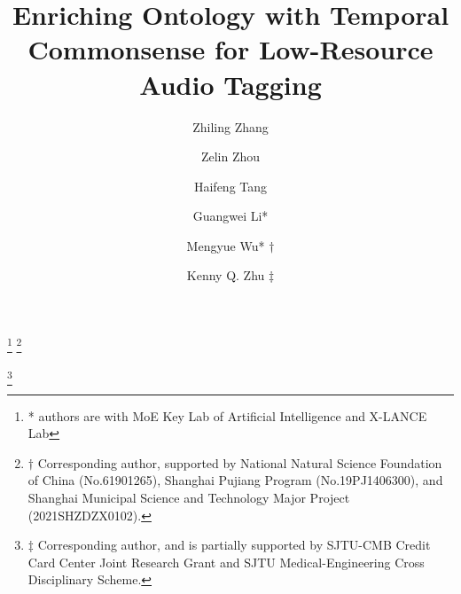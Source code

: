 \documentclass[sigconf]{acmart}
\begin{document}
\fancyhead{}%

\title{Enriching Ontology with Temporal Commonsense for Low-Resource Audio Tagging}


\author{Zhiling Zhang}

\author{Zelin Zhou}

\author{Haifeng Tang}

\author{Guangwei Li*}

\author{Mengyue Wu* $\dagger$}
\thanks{* authors are with MoE Key Lab of Artificial Intelligence and X-LANCE Lab}
\thanks{$\dagger$ Corresponding author, supported by National Natural Science Foundation of China (No.61901265), 
Shanghai Pujiang Program (No.19PJ1406300), and Shanghai Municipal Science and Technology Major Project (2021SHZDZX0102).}

\author{Kenny Q. Zhu $\ddagger$}
\thanks{$\ddagger$ Corresponding author, and is partially supported by
SJTU-CMB Credit Card Center Joint Research Grant and SJTU Medical-Engineering
Cross Disciplinary Scheme.}
\end{document}
